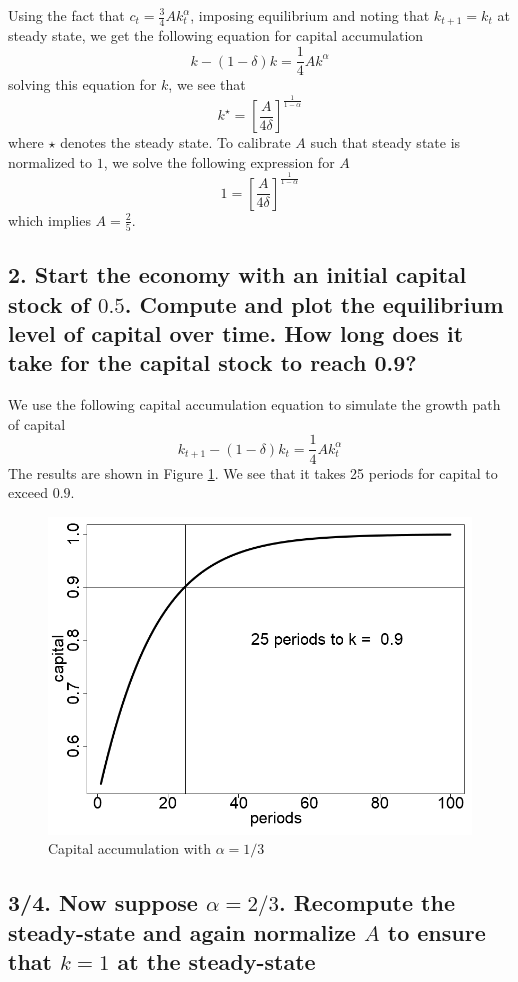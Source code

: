\documentclass[10pt,letter]{article}
\begin{document}
	Using the fact that $c_t = \frac{3}{4}Ak_t^\alpha$, imposing equilibrium and noting that $k_{t+1} = k_t$ at steady state, we get the following equation for capital accumulation
	\begin{equation*}
		k - (1-\delta)k = \frac{1}{4}Ak^\alpha
	\end{equation*}
	solving this equation for $k$, we see that 
	\begin{equation*}
		k^\star = \left[\frac{A}{4\delta}\right]^{\frac{1}{1-\alpha}}
	\end{equation*}
	where $\star$ denotes the steady state. To calibrate $A$ such that steady state is normalized to $1$, we solve the following expression for $A$
	\begin{equation}
		1 = \left[\frac{A}{4\delta}\right]^{\frac{1}{1-\alpha}}
		\label{eq:A_calibration}
	\end{equation}
	which implies $A = \frac{2}{5}$. 
	\subsection*{2. Start the economy with an initial capital stock of $0.5$. Compute and plot the equilibrium level of capital over time. How long does it take for the capital stock to reach 0.9?}
     We use the following capital accumulation equation to simulate the growth path of capital 
    \begin{equation}
    	k_{t+1} -(1-\delta)k_t = \frac{1}{4}Ak_t^\alpha
    	\label{eq:capital_accumulation}
    \end{equation}
    The results are shown in Figure \ref{fig:cap_accumulation_alpha_low}. We see that it takes 25 periods for capital to exceed $0.9$. 
    \begin{figure}[!htb]
    	\centering
    	\includegraphics[width=0.5\linewidth]{solow_growth_alpha_low.png}
    	\caption{Capital accumulation with $\alpha = 1/3$}
    	\label{fig:cap_accumulation_alpha_low}
    \end{figure}
	\subsection*{3/4. Now suppose $\alpha = 2/3$. Recompute the steady-state and again normalize $A$ to ensure that $k=1$ at the steady-state}
	
\end{document}
